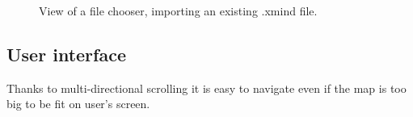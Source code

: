 \begin{figure}[h]
	\centering
	\caption{View of a file chooser, importing an existing .xmind file.}
	\label{fig:screen-filechooser}
\end{figure}

\subsection{User interface}
\label{subsec:ui}
Thanks to multi-directional scrolling it is easy to navigate even if the map is too big to be fit on user's screen.

